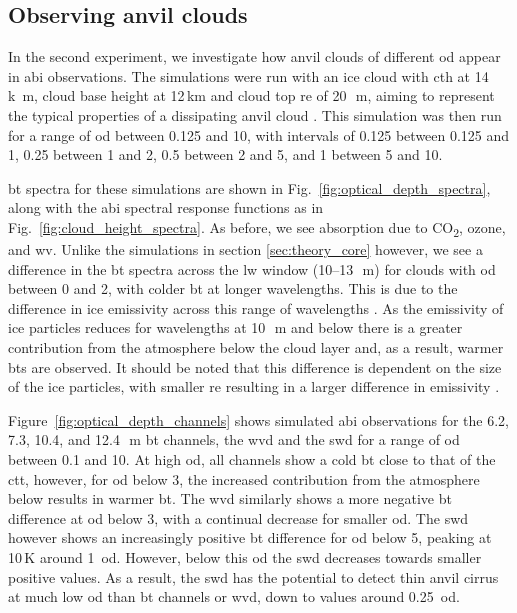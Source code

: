 \subsection{Observing anvil clouds}

In the second experiment, we investigate how anvil clouds of different \acrshort{od} appear in \acrshort{abi} observations.
The simulations were run with an ice cloud with \acrshort{cth} at 14\,\unit{k m}, cloud base height at 12\,\unit{km} and cloud top \acrshort{re} of 20\,\unit{\mu m}, aiming to represent the typical properties of a dissipating anvil cloud \citep{sokol_tropical_2020}.
This simulation was then run for a range of \acrshort{od} between 0.125 and 10, with intervals of 0.125 between 0.125 and 1, 0.25 between 1 and 2, 0.5 between 2 and 5, and 1 between 5 and 10.

\acrshort{bt} spectra for these simulations are shown in Fig.~\ref{fig:optical_depth_spectra}, along with the \acrshort{abi} spectral response functions as in Fig.~\ref{fig:cloud_height_spectra}.
As before, we see absorption due to CO\textsubscript{2}, ozone, and \acrshort{wv}.
Unlike the simulations in section \ref{sec:theory_core} however, we see a difference in the \acrshort{bt} spectra across the \acrshort{lw} window (10--13\,\unit{\mu m}) for clouds with \acrshort{od} between 0 and 2, with colder \acrshort{bt} at longer wavelengths.
This is due to the difference in ice emissivity across this range of wavelengths \citep{fu_radiation_2015}.
As the emissivity of ice particles reduces for wavelengths at 10\,\unit{\mu m} and below there is a greater contribution from the atmosphere below the cloud layer and, as a result, warmer \acrshort{bt}s are observed.
It should be noted that this difference is dependent on the size of the ice particles, with smaller \acrshort{re} resulting in a larger difference in emissivity \citep{dubuisson_sensitivity_2008}.

Figure~\ref{fig:optical_depth_channels} shows simulated \acrshort{abi} observations for the 6.2, 7.3, 10.4, and 12.4\,\unit{\mu m} \acrshort{bt} channels, the \acrshort{wvd} and the \acrshort{swd} for a range of \acrshort{od} between 0.1 and 10.
At high \acrshort{od}, all channels show a cold \acrshort{bt} close to that of the \acrshort{ctt}, however, for \acrshort{od} below 3, the increased contribution from the atmosphere below results in warmer \acrshort{bt}.
The \acrshort{wvd} similarly shows a more negative \acrshort{bt} difference at \acrshort{od} below 3, with a continual decrease for smaller \acrshort{od}.
The \acrshort{swd} however shows an increasingly positive \acrshort{bt} difference for \acrshort{od} below 5, peaking at 10\,\unit{K} around 1~\acrshort{od}.
However, below this \acrshort{od} the \acrshort{swd} decreases towards smaller positive values.
As a result, the \acrshort{swd} has the potential to detect thin anvil cirrus at much low \acrshort{od} than \acrshort{bt} channels or \acrshort{wvd}, down to values around 0.25~\acrfull{od}.

